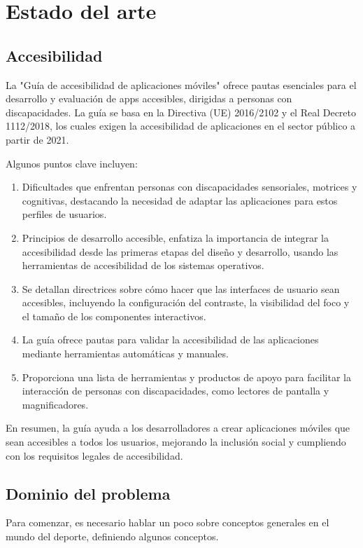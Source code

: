 \chapter{Estado del arte}

\section{Accesibilidad}

La "Guía de accesibilidad de aplicaciones móviles" ofrece pautas esenciales para el desarrollo y evaluación de apps accesibles, dirigidas a personas con discapacidades. La guía se basa en la Directiva (UE) 2016/2102 y el Real Decreto 1112/2018, los cuales exigen la accesibilidad de aplicaciones en el sector público a partir de 2021.

Algunos puntos clave incluyen:

\begin{enumerate}
	\item Dificultades que enfrentan personas con discapacidades sensoriales, motrices y cognitivas, destacando la necesidad de adaptar las aplicaciones para estos perfiles de usuarios.

	\item Principios de desarrollo accesible, enfatiza la importancia de integrar la accesibilidad desde las primeras etapas del diseño y desarrollo, usando las herramientas de accesibilidad de los sistemas operativos.

	\item Se detallan directrices sobre cómo hacer que las interfaces de usuario sean accesibles, incluyendo la configuración del contraste, la visibilidad del foco y el tamaño de los componentes interactivos.

	\item La guía ofrece pautas para validar la accesibilidad de las aplicaciones mediante herramientas automáticas y manuales.

	\item Proporciona una lista de herramientas y productos de apoyo para facilitar la interacción de personas con discapacidades, como lectores de pantalla y magnificadores.
\end{enumerate}

En resumen, la guía ayuda a los desarrolladores a crear aplicaciones móviles que sean accesibles a todos los usuarios, mejorando la inclusión social y cumpliendo con los requisitos legales de accesibilidad.

\section{Dominio del problema}
Para comenzar, es necesario hablar un poco sobre conceptos generales en el mundo del deporte, definiendo algunos conceptos.

